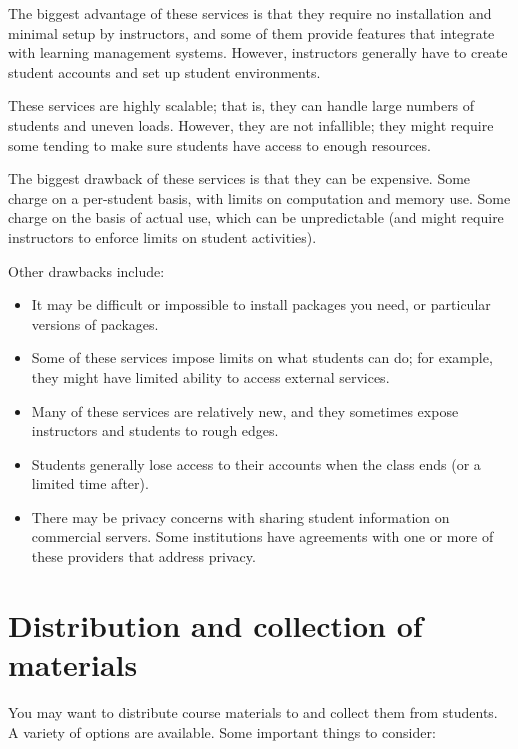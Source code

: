 \documentclass[]{book}
\begin{document}
The biggest advantage of these services is that they require no
installation and minimal setup by instructors, and some of them provide
features that integrate with learning management systems. However,
instructors generally have to create student accounts and set up student
environments.

These services are highly scalable; that is, they can handle large
numbers of students and uneven loads. However, they are not infallible;
they might require some tending to make sure students have access to
enough resources.

The biggest drawback of these services is that they can be expensive.
Some charge on a per-student basis, with limits on computation and
memory use. Some charge on the basis of actual use, which can be
unpredictable (and might require instructors to enforce limits on
student activities).

Other drawbacks include:

\begin{itemize}
\item
  It may be difficult or impossible to install packages you need, or
  particular versions of packages.
\item
  Some of these services impose limits on what students can do; for
  example, they might have limited ability to access external services.
\item
  Many of these services are relatively new, and they sometimes expose
  instructors and students to rough edges.
\item
  Students generally lose access to their accounts when the class ends
  (or a limited time after).
\item
  There may be privacy concerns with sharing student information on
  commercial servers. Some institutions have agreements with one or more
  of these providers that address privacy.
\end{itemize}

\section{Distribution and collection of
materials}\label{distribution-and-collection-of-materials}

You may want to distribute course materials to and collect them from
students. A variety of options are available. Some important things to
consider:
\end{document}
